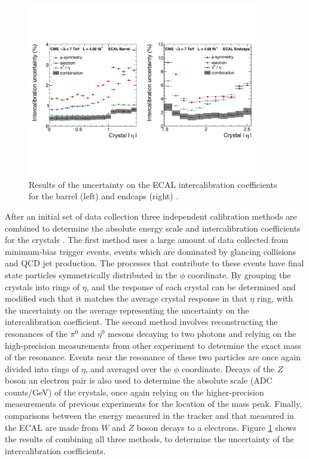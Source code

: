 \begin{figure}[h]
   \centering
  \includegraphics[width=0.9\textwidth]{Figures/Reconstruction_Diagrams/ECAL_intercalibration_combined_methods.pdf}
  \caption{Results of the uncertainty on the ECAL intercalibration
    coefficients for the barrel (left) and endcaps (right)
    \cite{Chatrchyan:1554142}. } \label{fig:ecal_intercal}
\end{figure}

\par After an initial set of data collection three independent
calibration methods are combined to determine the absolute energy
scale and intercalibration coefficients for the crystals
\cite{Chatrchyan:155414}.  The first method uses a large amount of
data collected from minimum-bias trigger events, events which are
dominated by glancing collisions and QCD jet production.  The
processes that contribute to these events have final state particles
symmetrically distributed in the $\phi$ coordinate.  By grouping the
crystals into rings of $\eta$, and the response of each crystal can be
determined and modified such that it matches the average crystal
response in that $\eta$ ring, with the uncertainty on the average
representing the uncertainty on the intercalibration coefficient.  The
second method involves reconstructing the resonances of the $\pi^{0}$
and $\eta^{0}$ mesons decaying to two photons and relying on the
high-precision measurements from other experiment to determine the
exact mass of the resonance.  Events near the resonance of these two
particles are once again divided into rings of $\eta$, and averaged
over the $\phi$ coordinate.  Decays of the $Z$ boson an electron pair
is also used to determine the absolute scale (ADC counts/GeV) of the
crystals, once again relying on the higher-precision measurements of
previous experiments for the location of the mass peak.  Finally,
comparisons between the energy measured in the tracker and that
measured in the ECAL are made from $W$ and $Z$ boson decays to a
electrons.  Figure \ref{fig:ecal_intercal} shows the results of
combining all three methods, to determine the uncertainty of the
intercalibration coefficients.  

